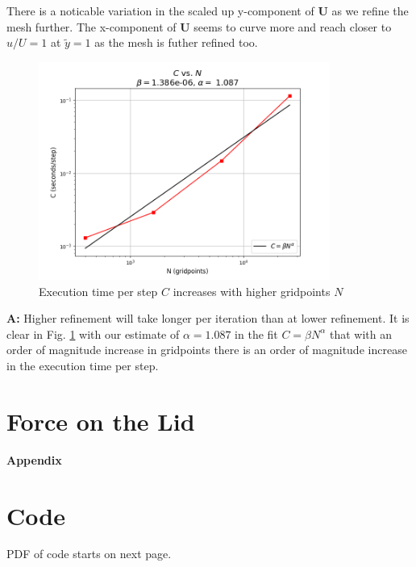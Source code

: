 \documentclass[11pt]{article}
\begin{document}
There is a noticable variation in the scaled up y-component of $\textbf{U}$ as we refine the mesh further. The x-component of $\textbf{U}$ seems to curve more and reach closer to $u/U = 1$ at $\tilde{y}=1$ as the mesh is futher refined too. 

\pagebreak
\begin{figure}[H]
   \centering
   \includegraphics[width=0.85\textwidth]{images/Refinement_Measure.png}
   \caption{Execution time per step $C$ increases with higher gridpoints $N$}
   \label{timerefine}
\end{figure} 

\begin{center} 
\end{center}

\textbf{A:} Higher refinement will take longer per iteration than at lower refinement. It is clear in Fig. \ref{timerefine} with our estimate of $\alpha = 1.087$ in the fit $C = \beta N^{\alpha}$ that with an order of magnitude increase in gridpoints there is an order of magnitude increase in the execution time per step.

\pagebreak

\section{Force on the Lid}



\pagebreak
\appendix
{} 
\begin{center}
\vspace*{\fill}
   \Huge \bf Appendix 
\vspace*{\fill}
\end{center}
\pagebreak 

\hypertarget{code}{}
\section{Code}
PDF of code starts on next page.
\end{document}
